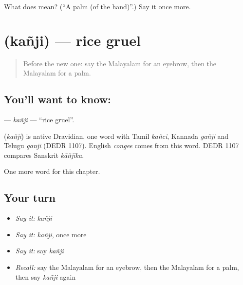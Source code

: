 \begin{tcolorbox}[breakable,colback=teal!4,colframe=teal!35!black,title={Before you move on}]
What does  mean? (\textquotedblleft{}A palm (of the hand)\textquotedblright{}.) Say it once more.
\end{tcolorbox}
\section[\texorpdfstring{\ml{കഞ്ഞി} (kañji)}{കഞ്ഞി (kañji)}]{ (kañji) — rice gruel}

\label{lesson:ML-C163-kanji}



\begin{quote}
Before the new one: say the Malayalam for an eyebrow, then the Malayalam for a palm.
\end{quote}

\subsection*{You'll want to know: }
\textbf{} — \emph{kañji} — \textquotedblleft{}rice gruel\textquotedblright{}.

\begin{cousinweb}
\textbf{} (\emph{kañji}) is native Dravidian, one word with Tamil \emph{kañci}, Kannada \emph{gañji} and Telugu \emph{ganji} (DEDR 1107). English \emph{congee} comes from this word. DEDR 1107 compares Sanskrit \emph{kāñjīka}.
\end{cousinweb}

\begin{grammarlens}[title={What you've built}]
One more word for this chapter.
\end{grammarlens}

\subsection*{Your turn}
\begin{itemize}
\raggedright
  \item \emph{Say it:} \emph{kañji}
  \item \emph{Say it:} \emph{kañji}, once more
  \item \emph{Say it:} say \emph{kañji}
  \item \emph{Recall:} say the Malayalam for an eyebrow, then the Malayalam for a palm, then say \emph{kañji} again
\end{itemize}

